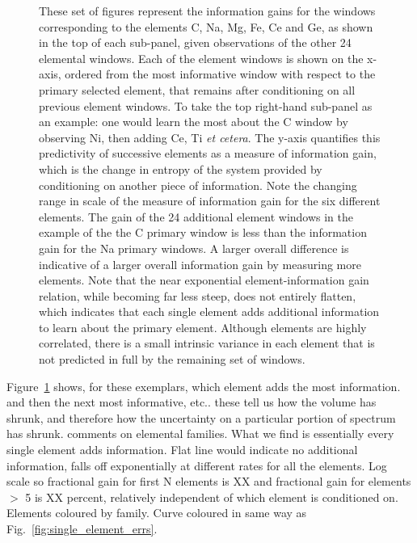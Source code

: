 \documentclass[a4paper,fleqn,usenatbib]{mnras}
\begin{document}
\begin{figure}
    \caption{These set of figures represent the information gains for the windows corresponding to the elements C, Na, Mg, Fe, Ce and Ge, as shown in the top of each sub-panel, given observations of the other 24 elemental windows. Each of the element windows is shown on the x-axis, ordered from the most informative window with respect to the primary selected element, that remains after conditioning on all previous element windows. To take the top right-hand sub-panel as an example: one would learn the most about the C window by observing Ni, then adding Ce, Ti {\it et cetera}. The y-axis quantifies this predictivity of successive elements as a measure of information gain, which is the change in entropy of the system provided by conditioning on another piece of information. Note the changing range in scale of the measure of information gain for the six different elements. The gain of the 24 additional element windows in the example of the the C primary window is less than the information gain for the Na primary windows. A larger overall difference is indicative of a larger overall information gain by measuring more elements. Note that the near exponential element-information gain relation, while becoming far less steep, does not entirely flatten, which indicates that each single element adds additional information to learn about the primary element. Although elements are highly correlated, there is a small intrinsic variance in each element that is not predicted in full by the remaining set of windows. }
    \label{fig:single_element_information}
\end{figure}



Figure~\ref{fig:single_element_information} shows, for these exemplars, which element adds the most information. and then the next most informative, etc.. these tell us how the volume has shrunk, and therefore how the uncertainty on a particular portion of spectrum has shrunk. comments on elemental families.
What we find is essentially every single element adds information. Flat line would indicate no additional information, falls off exponentially at different rates for all the elements. Log scale so fractional gain for first N elements is XX and fractional gain for elements $>$ 5 is XX percent, relatively independent of which element is conditioned on. Elements coloured by family. Curve coloured in same way as Fig.~\ref{fig:single_element_errs}.
\end{document}
